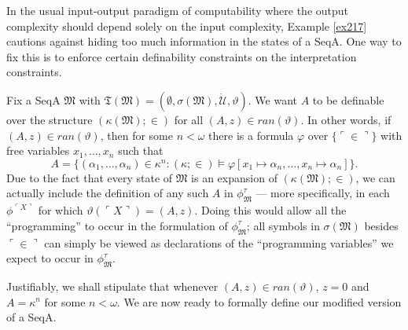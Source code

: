 \documentclass[12pt]{article}
\numberwithin{equation}{section}
\begin{document}
In the usual input-output paradigm of computability where the output complexity should depend solely on the input complexity, Example \ref{ex217} cautions against hiding too much information in the states of a SeqA. One way to fix this is to enforce certain definability constraints on the interpretation constraints. 

Fix a SeqA $\mathfrak{M}$ with $\mathfrak{T}(\mathfrak{M}) = (\emptyset, \sigma(\mathfrak{M}), \dot{\mathcal{U}}, \vartheta)$. We want $A$ to be definable over the structure $(\kappa(\mathfrak{M}); \in)$ for all $(A, z) \in ran(\vartheta)$. In other words, if $(A, z) \in ran(\vartheta)$, then for some $n < \omega$ there is a formula $\varphi$ over $\{\ulcorner \in \urcorner\}$ with free variables $x_1, \dots, x_n$ such that 
\begin{equation*}
    A = \{(\alpha_1, \dots, \alpha_n) \in \kappa^n : (\kappa; \in) \models \varphi[x_1 \mapsto \alpha_n, \dots, x_n \mapsto \alpha_n]\} \text{.}
\end{equation*}
Due to the fact that every state of $\mathfrak{M}$ is an expansion of $(\kappa(\mathfrak{M}); \in)$, we can actually include the definition of any such $A$ in $\phi^{\tau}_{\mathfrak{M}}$ --- more specifically, in each $\phi^{\ulcorner X \urcorner}$ for which $\vartheta(\ulcorner X \urcorner) = (A, z)$. Doing this would allow all the ``programming'' to occur in the formulation of $\phi^{\tau}_{\mathfrak{M}}$; all symbols in $\sigma(\mathfrak{M})$ besides $\ulcorner \in \urcorner$ can simply be viewed as declarations of the ``programming variables'' we expect to occur in $\phi^{\tau}_{\mathfrak{M}}$. 

Justifiably, we shall stipulate that whenever $(A, z) \in ran(\vartheta)$, $z = 0$ and $A = \kappa^n$ for some $n < \omega$. We are now ready to formally define our modified version of a SeqA.
\end{document}
